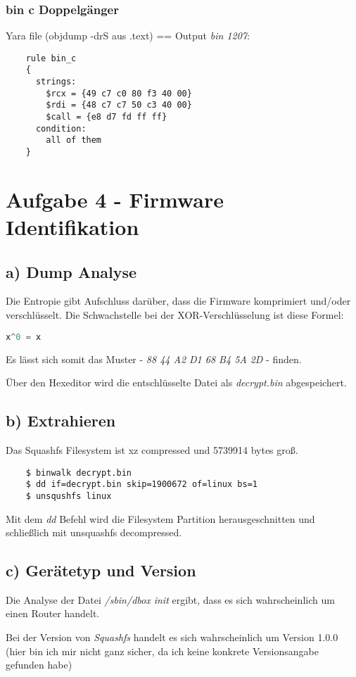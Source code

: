\subsubsection*{bin c Doppelgänger}

Yara file (objdump -drS aus .text) == Output \textit{bin 1207}:

\begin{lstlisting}
    rule bin_c
    {
      strings:
        $rcx = {49 c7 c0 80 f3 40 00}
        $rdi = {48 c7 c7 50 c3 40 00}
        $call = {e8 d7 fd ff ff}
      condition:
        all of them
    }

\end{lstlisting}

\section*{Aufgabe 4 - Firmware Identifikation}

\subsection*{a) Dump Analyse}

Die Entropie gibt Aufschluss darüber, dass die Firmware komprimiert und/oder verschlüsselt.
Die Schwachstelle bei der XOR-Verschlüsselung ist diese Formel:
\begin{lstlisting}[language=Python]
    x^0 = x
\end{lstlisting}

Es lässt sich somit das Muster - \textit{88 44 A2 D1 68 B4 5A 2D} - finden.

Über den Hexeditor wird die entschlüsselte Datei als \textit{decrypt.bin} abgespeichert.

\subsection*{b) Extrahieren}

Das Squashfs Filesystem ist xz compressed und 5739914 bytes groß.
\begin{lstlisting}
    $ binwalk decrypt.bin
    $ dd if=decrypt.bin skip=1900672 of=linux bs=1
    $ unsqushfs linux
\end{lstlisting}

Mit dem \textit{dd} Befehl wird die Filesystem Partition herausgeschnitten und schließlich mit unsquashfs decompressed.

\subsection*{c) Gerätetyp und Version}

Die Analyse der Datei \textit{/sbin/dbox init} ergibt, dass es sich wahrscheinlich um einen Router handelt.

Bei der Version von \textit{Squashfs} handelt es sich wahrscheinlich um Version 1.0.0 (hier bin ich mir nicht ganz sicher,
 da ich keine konkrete Versionsangabe gefunden habe)


